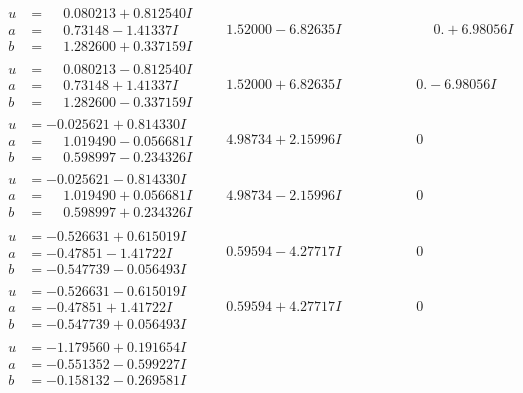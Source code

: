 \documentclass[1p]{elsarticle_modified}
\theoremstyle{definition}
\begin{document}
$$\begin{array}{c|c|c}
\begin{aligned}
u &= \phantom{-}0.080213 + 0.812540 I \\
a &= \phantom{-}0.73148 - 1.41337 I \\
b &= \phantom{-}1.282600 + 0.337159 I\end{aligned}
 & \phantom{-}1.52000 - 6.82635 I & \phantom{-0.000000 -}0. + 6.98056 I \\ \hline\begin{aligned}
u &= \phantom{-}0.080213 - 0.812540 I \\
a &= \phantom{-}0.73148 + 1.41337 I \\
b &= \phantom{-}1.282600 - 0.337159 I\end{aligned}
 & \phantom{-}1.52000 + 6.82635 I & \phantom{-0.000000 } 0. - 6.98056 I \\ \hline\begin{aligned}
u &= -0.025621 + 0.814330 I \\
a &= \phantom{-}1.019490 - 0.056681 I \\
b &= \phantom{-}0.598997 - 0.234326 I\end{aligned}
 & \phantom{-}4.98734 + 2.15996 I & \phantom{-0.000000 } 0 \\ \hline\begin{aligned}
u &= -0.025621 - 0.814330 I \\
a &= \phantom{-}1.019490 + 0.056681 I \\
b &= \phantom{-}0.598997 + 0.234326 I\end{aligned}
 & \phantom{-}4.98734 - 2.15996 I & \phantom{-0.000000 } 0 \\ \hline\begin{aligned}
u &= -0.526631 + 0.615019 I \\
a &= -0.47851 - 1.41722 I \\
b &= -0.547739 - 0.056493 I\end{aligned}
 & \phantom{-}0.59594 - 4.27717 I & \phantom{-0.000000 } 0 \\ \hline\begin{aligned}
u &= -0.526631 - 0.615019 I \\
a &= -0.47851 + 1.41722 I \\
b &= -0.547739 + 0.056493 I\end{aligned}
 & \phantom{-}0.59594 + 4.27717 I & \phantom{-0.000000 } 0 \\ \hline\begin{aligned}
u &= -1.179560 + 0.191654 I \\
a &= -0.551352 - 0.599227 I \\
b &= -0.158132 - 0.269581 I\end{aligned}

\end{array}$$
\end{document}
